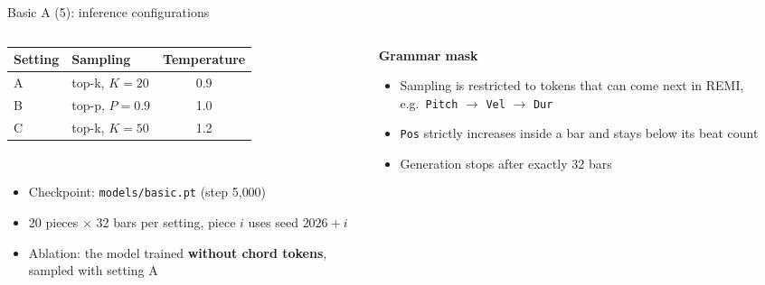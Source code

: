 \documentclass[aspectratio=169,11pt]{beamer}
\newenvironment{tight}{\begin{itemize}\setlength{\itemsep}{1.5pt}\setlength{\parskip}{0pt}\setlength{\topsep}{0pt}}{\end{itemize}}
\begin{document}
\begin{frame}[t]{Basic A (5): inference configurations}
  \begin{columns}[T]
    \begin{column}{0.5\textwidth}
      \small
      \begin{tabular}{@{}llc@{}}
        \toprule
        Setting & Sampling & Temperature \\ \midrule
        A & top-k, $K = 20$ & 0.9 \\
        B & top-p, $P = 0.9$ & 1.0 \\
        C & top-k, $K = 50$ & 1.2 \\
        \bottomrule
      \end{tabular}\\[0.6em]
      \begin{tight}
        \item Checkpoint: \texttt{models/basic.pt} (step 5{,}000)
        \item 20 pieces $\times$ 32 bars per setting, piece $i$ uses seed $2026 + i$
        \item Ablation: the model trained \textbf{without chord tokens}, sampled with setting A
      \end{tight}
    \end{column}
    \begin{column}{0.5\textwidth}
      \textbf{Grammar mask}
      \begin{tight}\small
        \item Sampling is restricted to tokens that can come next in REMI, e.g.\ \texttt{Pitch} $\rightarrow$ \texttt{Vel} $\rightarrow$ \texttt{Dur}
        \item \texttt{Pos} strictly increases inside a bar and stays below its beat count
        \item Generation stops after exactly 32 bars
      \end{tight}
    \end{column}
  \end{columns}
\end{frame}
\end{document}
